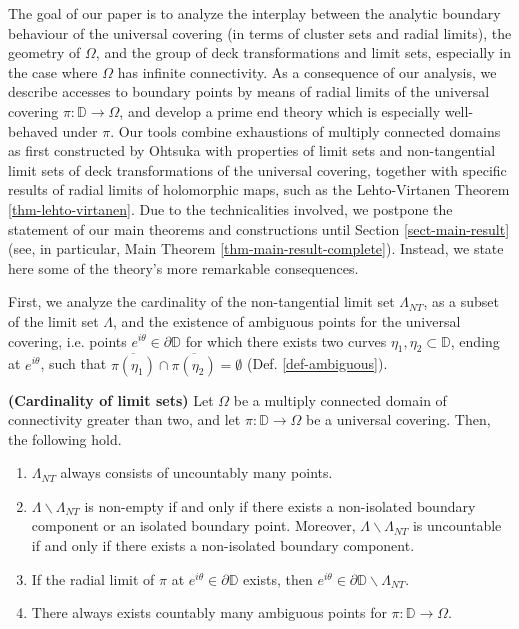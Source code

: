 \documentclass[11pt,a4paper,reqno]{amsart}
\makeatletter
\theoremstyle{plain}
\theoremstyle{definition}
\theoremstyle{plain}
\newcounter{namedthm}
\newenvironment{named}[1]
{\def\namedthmname{#1}%
	\refstepcounter{namedthm}%
	\namedthm\def\@currentlabel{#1}}
{\endnamedthm}
\def\DD{\mathbb{D}}
\renewcommand{\setminus}{\smallsetminus}
\makeatother
\begin{document}
The goal of our paper is to analyze the interplay between the analytic boundary behaviour of the universal covering (in terms of cluster sets and radial limits), the geometry of $ \Omega $, and the group of deck transformations and limit sets, especially in the case where $ \Omega $ has infinite connectivity. As a consequence of our analysis, we describe accesses to boundary points by means of radial limits of the universal covering $ \pi\colon\mathbb{D}\to\Omega $, and develop a prime end theory which is especially well-behaved under $ \pi $. Our tools combine exhaustions of multiply connected domains as first constructed by Ohtsuka \cite{Oht54} with properties of limit sets and non-tangential limit sets of deck transformations of the universal covering, together with specific results of radial limits of holomorphic maps, such as the Lehto-Virtanen Theorem \ref{thm-lehto-virtanen}. Due to the technicalities involved, we postpone the statement of our main theorems and constructions until Section \ref{sect-main-result} (see, in particular, Main Theorem \ref{thm-main-result-complete}). Instead, we state here some of the theory's more remarkable consequences.

First, we analyze the cardinality of the non-tangential limit set $ \Lambda_{NT} $, as a subset of the limit set $ \Lambda $, and the existence of ambiguous points for the universal covering, i.e. points $ e^{i\theta}\in\partial\mathbb{D} $ for which there exists two curves $ \eta_1,\eta_2\subset\mathbb{D} $, ending at $ e^{i\theta} $, such that $ \overline{\pi(\eta_1)}\cap \overline{\pi(\eta_2)}=\emptyset $ (Def. \ref{def-ambiguous}).%

\begin{named}{Theorem A}\label{teo:A} {\bf (Cardinality of limit sets)}
		Let $ \Omega $ be a multiply connected domain of connectivity greater than two, and let $ \pi\colon \mathbb{D}\to\Omega $ be a universal covering. Then, the following hold.
	\begin{enumerate}[label={\em (\alph*)}]
		\item $ \Lambda_{NT} $ always consists of uncountably many points.
		\item $ \Lambda\smallsetminus \Lambda_{NT} $ is non-empty if and only if there exists a non-isolated boundary component or an isolated boundary point. Moreover, $ \Lambda\smallsetminus \Lambda_{NT} $ is uncountable if and only if there exists a non-isolated boundary component.
		\item If the radial limit of $ \pi  $ at $ e^{i\theta}\in\partial\mathbb{D} $  exists, then $ e^{i\theta}\in\partial\DD\setminus\Lambda_{NT}$.
		\item There always exists countably many ambiguous points for $ \pi\colon \mathbb{D}\to\Omega $.
	\end{enumerate}
\end{named}
\end{document}
